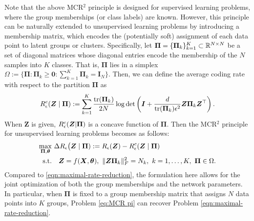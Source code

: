 \documentclass[../../book-main.tex]{subfiles}
\begin{document}
 
    Note that the above MCR$^2$  principle is designed for supervised learning problems, where the group memberships (or class labels) are known. However, this principle can be naturally extended to unsupervised learning problems by introducing a membership matrix, which encodes the (potentially soft) assignment of each data point to latent groups or clusters. Specifically, let $\bm \Pi = \{\bm \Pi_k\}_{k=1}^K \subset \mathbb{R}^{N\times N}$ be a set of diagonal matrices whose diagonal entries encode the membership of the $N$ samples into $K$ classes. That is, $\bm \Pi$ lies in a simplex $\Omega := \{\bm \Pi: \bm \Pi_k \ge \bm 0: \sum_{k=1}^K \bm \Pi_k = \bm I_N\}$. Then, we can define the average coding rate with respect to the partition $\bm \Pi$ as
    \begin{align}\label{eq:MCRc}
        R_{\epsilon}^c(\bm{Z} \mid \bm \Pi) := \sum_{k=1}^K \frac{\mathrm{tr}(\bm \Pi_k)}{2N}\log\det\left(\bm I + \frac{d}{\mathrm{tr}(\bm \Pi_k)\epsilon^2}\bm Z\bm \Pi_k \bm Z^\top \right).
    \end{align}
    When $\bm Z$ is given, $R_{\epsilon}^c(\bm{Z} \vert \bm \Pi)$ is a concave function of $\bm \Pi$. Then the MCR$^2$ principle for unsupervised learning problems becomes as follows:
    \begin{align}\label{eq:MCR pi}
        \max_{\bm \Pi, \bm \theta} & \  \Delta R_{\epsilon}\big(\bm{Z}  \mid \bm \Pi) := R_{\epsilon}(\bm Z) - R_{\epsilon}^c(\bm{Z} \mid \bm \Pi) \notag \\ 
       \mathrm{s.t.}  & \ \ \ \bm Z = f(\bm X, \bm \theta),\ \|\bm Z \bm \Pi_k\|_F^2 = N_k,\ k = 1,\dots,K,\ \bm\Pi \in \Omega. 
    \end{align}
    Compared to \eqref{eqn:maximal-rate-reduction}, the formulation here allows for the joint optimization of both the group memberships and the network parameters. In particular, when $\bm \Pi$ is fixed to a group membership matrix that assigns $N$ data points into $K$ groups, Problem \eqref{eq:MCR pi} can recover Problem \eqref{eqn:maximal-rate-reduction}.
 
\end{document}
